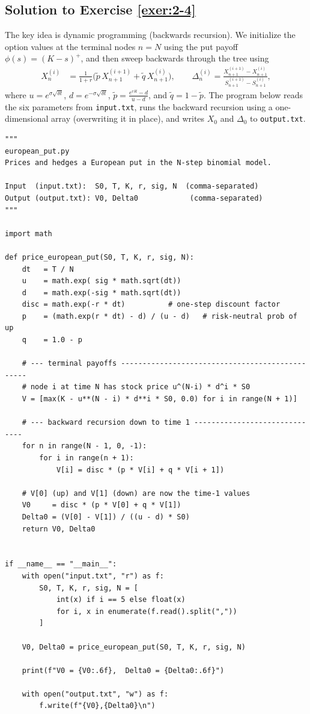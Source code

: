 \documentclass[12pt]{book}
\numberwithin{equation}{chapter}
\theoremstyle{plain}
\numberwithin{theorem}{section}
\theoremstyle{definition}
\numberwithin{exercise}{chapter}
\newcommand{\<}{\langle}
\renewcommand{\>}{\rangle}
\renewcommand{\(}{\left(}
\renewcommand{\)}{\right)}
\renewcommand{\[}{\left[}
\renewcommand{\]}{\right]}
\newcommand\sig{\sigma}
\newcommand\del{\delta}
\newcommand\Del{\Delta}
\newcommand\qt{\widetilde{q}}
\theoremstyle{definition}
\numberwithin{question}{section}
\newcommand\pt{\widetilde{p}}
\begin{document}

\subsection*{Solution to Exercise \ref{exer:2-4}}
The key idea is dynamic programming (backwards recursion).  We initialize the option values at the terminal nodes $n=N$ using the put payoff $\phi(s)=(K-s)^+$, and then sweep backwards through the tree using
\begin{align}
X_n^{(i)}
  &= \frac{1}{1+r} \bigl(\pt\, X_{n+1}^{(i+1)} + \qt\, X_{n+1}^{(i)}\bigr),
  \qquad
  \Del_n^{(i)} = \frac{X_{n+1}^{(i+1)}-X_{n+1}^{(i)}}{S_{n+1}^{(i+1)}-S_{n+1}^{(i)}},
\end{align}
where $u=e^{\sig\sqrt{\del t}}$, $d=e^{-\sig\sqrt{\del t}}$, $\pt=\frac{e^{r\del t}-d}{u-d}$, and $\qt=1-\pt$.
The program below reads the six parameters from \texttt{input.txt}, runs the backward recursion using a one-dimensional array (overwriting it in place), and writes $X_0$ and $\Del_0$ to \texttt{output.txt}.

\begin{lstlisting}[caption={European put -- binomial model (\texttt{european\_put.py})}]
"""
european_put.py
Prices and hedges a European put in the N-step binomial model.

Input  (input.txt):  S0, T, K, r, sig, N  (comma-separated)
Output (output.txt): V0, Delta0            (comma-separated)
"""

import math

def price_european_put(S0, T, K, r, sig, N):
    dt   = T / N
    u    = math.exp( sig * math.sqrt(dt))
    d    = math.exp(-sig * math.sqrt(dt))
    disc = math.exp(-r * dt)          # one-step discount factor
    p    = (math.exp(r * dt) - d) / (u - d)   # risk-neutral prob of up
    q    = 1.0 - p

    # --- terminal payoffs ------------------------------------------------
    # node i at time N has stock price u^(N-i) * d^i * S0
    V = [max(K - u**(N - i) * d**i * S0, 0.0) for i in range(N + 1)]

    # --- backward recursion down to time 1 ------------------------------
    for n in range(N - 1, 0, -1):
        for i in range(n + 1):
            V[i] = disc * (p * V[i] + q * V[i + 1])

    # V[0] (up) and V[1] (down) are now the time-1 values
    V0     = disc * (p * V[0] + q * V[1])
    Delta0 = (V[0] - V[1]) / ((u - d) * S0)
    return V0, Delta0


if __name__ == "__main__":
    with open("input.txt", "r") as f:
        S0, T, K, r, sig, N = [
            int(x) if i == 5 else float(x)
            for i, x in enumerate(f.read().split(","))
        ]

    V0, Delta0 = price_european_put(S0, T, K, r, sig, N)

    print(f"V0 = {V0:.6f},  Delta0 = {Delta0:.6f}")

    with open("output.txt", "w") as f:
        f.write(f"{V0},{Delta0}\n")
\end{lstlisting}
\end{document}
